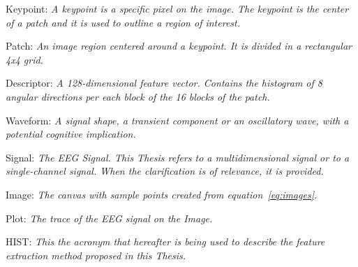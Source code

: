 \pagebreak

\begin{story}
\theoremstyle{definition}

\begin{definition}{Keypoint:}
\label{def:Keypoint}
\textit{A keypoint is a specific pixel on the image.  The keypoint is the center of a patch and it is used to outline a region of interest.}
\end{definition}

\begin{definition}{Patch:}
\label{def:Patch}
\textit{An image region centered around a keypoint.  It is divided in a rectangular 4x4 grid.}
\end{definition}

\begin{definition}{Descriptor:}
\label{def:Descriptor}
\textit{A 128-dimensional \textit{feature} vector.  Contains the histogram of 8 angular directions per each block of the 16 blocks of the patch.}
\end{definition}

\begin{definition}{Waveform:}
\label{def:Waveform}
\textit{A signal shape, a transient component or an oscillatory wave, with a potential cognitive implication.}
\end{definition}

\begin{definition}{Signal:}
\label{def:Signal}
\textit{The EEG Signal. This Thesis refers to a multidimensional signal or to a single-channel signal. When the clarification is of relevance, it is provided.}
\end{definition}

\begin{definition}{Image:}
\label{def:Image}
\textit{The \textit{canvas} with sample points created from equation~\ref{eq:images}.}
\end{definition}

\begin{definition}{Plot:}
\label{def:Plot}
\textit{The trace of the EEG signal on the Image.}
\end{definition}

\begin{definition}{HIST:}
\label{def:Plot}
\textit{This the acronym that hereafter is being used to describe the feature extraction method proposed in this Thesis.}
\end{definition}

\end{story}

